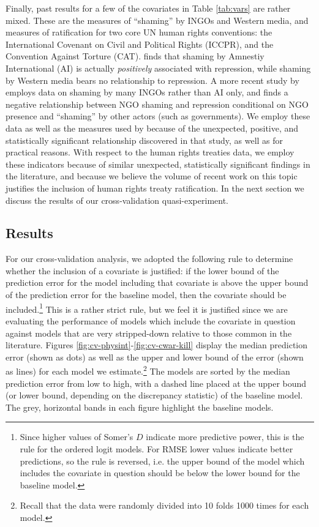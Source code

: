 \documentclass[12pt]{article}
\begin{document}
Finally, past results for a few of the covariates in Table \ref{tab:vars} are rather mixed. These are the measures of ``shaming'' by INGOs and Western media, and measures of ratification for two core UN human rights conventions: the International Covenant on Civil and Political Rights (ICCPR), and the Convention Against Torture (CAT). \citet{HafnerBurton2008} finds that shaming by Amnestiy International (AI) is actually {\it positively} associated with repression, while shaming by Western media bears no relationship to repression. A more recent study by \citet{MurdieDavis2012} employs data on shaming by many INGOs rather than AI only, and finds a negative relationship between NGO shaming and repression conditional on NGO presence and ``shaming'' by other actors (such as governments). We employ these data as well as the measures used by \citet{HafnerBurton2008} because of the unexpected, positive, and statistically significant relationship discovered in that study, as well as for practical reasons. With respect to the human rights treaties data, we employ these indicators because of similar unexpected, statistically significant findings in the literature, and because we believe the volume of recent work on this topic justifies the inclusion of human rights treaty ratification. In the next section we discuss the results of our cross-validation quasi-experiment.

\subsection{Results}

For our cross-validation analysis, we adopted the following rule to determine whether the inclusion of a covariate is justified: if the lower bound of the prediction error for the model including that covariate is above the upper bound of the prediction error for the baseline model, then the covariate should be included.\footnote{Since higher values of Somer's $D$ indicate more predictive power, this is the rule for the ordered logit models. For RMSE lower values indicate better predictions, so the rule is reversed, i.e. the upper bound of the model which includes the covariate in question should be below the lower bound for the baseline model.} This is a rather strict rule, but we feel it is justified since we are evaluating the performance of models which include the covariate in question against models that are very stripped-down relative to those common in the literature. Figures \ref{fig:cv-physint}-\ref{fig:cv-cwar-kill} display the median prediction error (shown as dots) as well as the upper and lower bound of the error (shown as lines) for each model we estimate.\footnote{Recall that the data were randomly divided into 10 folds 1000 times for each model.} The models are sorted by the median prediction error from low to high, with a dashed line placed at the upper bound (or lower bound, depending on the discrepancy statistic) of the baseline model. The grey, horizontal bands in each figure highlight the baseline models. 
\end{document}
